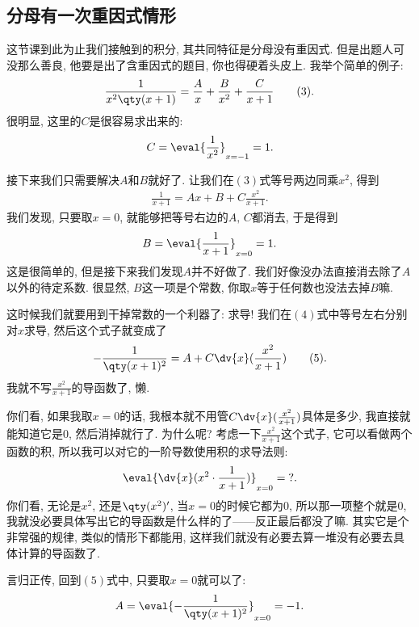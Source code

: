 \documentclass{ctexbook}
\begin{document}
{\subsection{分母有一次重因式情形}
这节课到此为止我们接触到的积分, 其共同特征是分母没有重因式. 但是出题人可没那么善良, 他要是出了含重因式的题目, 你也得硬着头皮上. 我举个简单的例子: 
\begin{align*}
\frac{1}{x^{2}\qty(x+1)}=\frac{A}{x}+\frac{B}{x^{2}}+\frac{C}{x+1}\tag{3}
.\end{align*}
很明显, 这里的$C$是很容易求出来的: 
\begin{align*}
C=\eval{\frac{1}{x^{2}}}_{x=-1}=1
.\end{align*}\par
接下来我们只需要解决$A$和$B$就好了. 让我们在$(3)$式等号两边同乘$x^{2}$, 得到
\begin{align*}
\frac{1}{x+1}=Ax+B+C\frac{x^{2}}{x+1}\tag{4}
.\end{align*}
我们发现, 只要取$x=0$, 就能够把等号右边的$A,\,C$都消去, 于是得到
\begin{align*}
B=\eval{\frac{1}{x+1}}_{x=0}=1
.\end{align*}
这是很简单的, 但是接下来我们发现$A$并不好做了. 我们好像没办法直接消去除了$A$以外的待定系数. 很显然, $B$这一项是个常数, 你取$x$等于任何数也没法去掉$B$嘛. \par
这时候我们就要用到干掉常数的一个利器了: 求导! 我们在$(4)$式中等号左右分别对$x$求导, 然后这个式子就变成了
\begin{align*}
-\frac{1}{\qty(x+1)^{2}}=A+C\dv{x}(\frac{x^{2}}{x+1})\tag{5}
.\end{align*}
我就不写$\frac{x^{2}}{x+1}$的导函数了, 懒. \par
你们看, 如果我取$x=0$的话, 我根本就不用管$C\dv{x}(\frac{x^{2}}{x+1})$具体是多少, 我直接就能知道它是$0$, 然后消掉就行了. 为什么呢? 
考虑一下$\frac{x^{2}}{x+1}$这个式子, 它可以看做两个函数的积, 所以我可以对它的一阶导数使用积的求导法则: 
\begin{align*}
\eval{\dv{x}(x^{2}\cdot\frac{1}{x+1})}_{x=0}=\;?
.\end{align*}
你们看, 无论是$x^{2}$, 还是$\qty(x^{2})'$, 当$x=0$的时候它都为$0$, 所以那一项整个就是$0$, 我就没必要具体写出它的导函数是什么样的了——反正最后都没了嘛. 其实它是个非常强的规律, 类似的情形下都能用, 这样我们就没有必要去算一堆没有必要去具体计算的导函数了. \par
言归正传, 回到$(5)$式中, 只要取$x=0$就可以了: 
\begin{align*}
A=\eval{-\frac{1}{\qty(x+1)^{2}}}_{x=0}=-1
.\end{align*}
}
\end{document}
